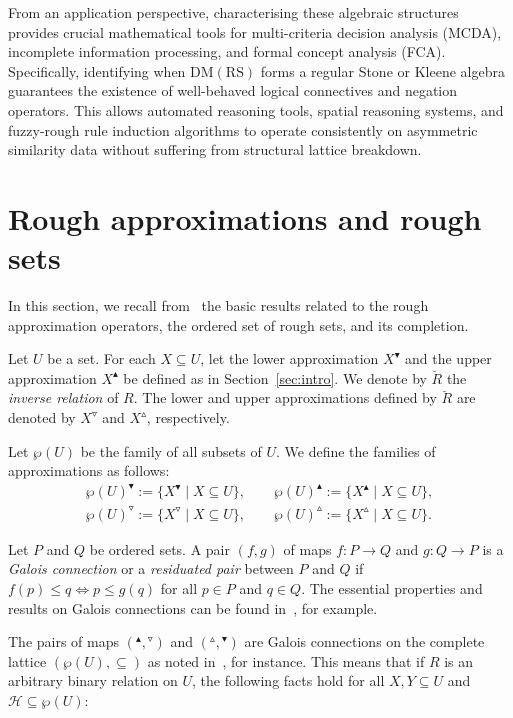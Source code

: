 \documentclass[11pt,a4paper]{amsart}
\newcommand{\UP}{\blacktriangle}
\newcommand{\DOWN}{\blacktriangledown}
\newcommand{\Up}{\vartriangle}
\newcommand{\Down}{\triangledown}
\theoremstyle{plain}
\theoremstyle{definition}
\theoremstyle{remark}
\numberwithin{equation}{section}
\begin{document}
From an application perspective, characterising these algebraic structures provides crucial mathematical tools for multi-criteria decision analysis (MCDA), incomplete information processing, and formal concept analysis (FCA). Specifically, identifying when $\mathrm{DM(RS)}$ forms a regular Stone or Kleene algebra guarantees the existence of well-behaved logical connectives and negation operators. This allows automated reasoning tools, spatial reasoning systems, and fuzzy-rough rule induction algorithms to operate consistently on asymmetric similarity data without suffering from structural lattice breakdown.



\section{Rough approximations and rough sets} \label{sec:rough_recall}

In this section, we recall from~\cite{Jarvinen2007, JarRad25} the basic results related to the rough approximation operators,
the ordered set of rough sets, and its completion.

Let $U$ be a set. For each $X \subseteq U$, let the lower 
approximation $X^\DOWN$ and the upper approximation $X^\UP$ be defined
as in Section~\ref{sec:intro}. We denote by $\breve{R}$
the \emph{inverse relation} of $R$. The lower and upper
approximations defined by $\breve{R}$ are denoted 
by $X^\Down$ and $X^\Up$, respectively.



Let $\wp(U)$ be the family of all subsets of $U$. 
We define the families of  approximations as follows:
\begin{gather*}
\wp(U)^\DOWN := \{ X^\DOWN \mid X \subseteq U\}, \qquad \wp(U)^\UP := \{ X^\UP \mid X \subseteq U\}, \\
\wp(U)^\Down:= \{ X^\Down \mid X \subseteq U\}, \qquad \wp(U)^\Up := \{ X^\Up \mid X \subseteq U\}. 
\end{gather*}

Let $P$ and $Q$ be ordered sets. A pair
$(f,g)$ of maps $f \colon P \to Q$ and $g \colon Q \to P$
is a \emph{Galois connection} or a \emph{residuated pair} between $P$ and $Q$ if
$f(p) \leq q \iff p \leq g(q)$ for all $p \in P$ and $q \in Q$.
The essential properties and results on Galois connections
can be found in~\cite{Blyth2005,Davey02,Erne_primer}, for example.

The pairs of maps $({^\UP},{^\Down})$ and $({^\Up},{^\DOWN})$ are 
Galois connections on the complete lattice $(\wp(U),\subseteq)$ as noted in~\cite{Jarvinen2007}, for instance. 
This means that if $R$ is an arbitrary binary relation on
$U$, the following facts hold for all $X,Y \subseteq U$ and
$\mathcal{H} \subseteq \wp(U)$: 
\end{document}
